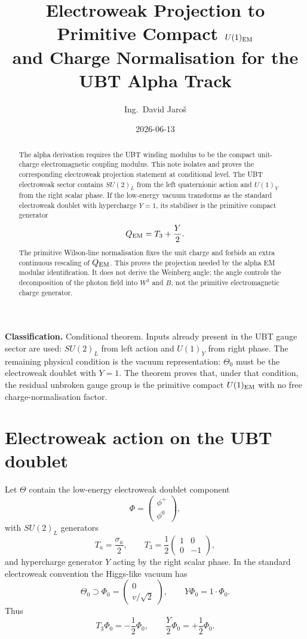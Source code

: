 \documentclass[12pt,a4paper]{article}
\title{Electroweak Projection to Primitive Compact $U(1)_{\rm EM}$\\
       \large and Charge Normalisation for the UBT Alpha Track}
\author{Ing.\ David Jaro\v{s}}
\date{2026-06-13}
\begin{document}
\maketitle
\fi

\begin{abstract}
The alpha derivation requires the UBT winding modulus to be the compact
unit-charge electromagnetic coupling modulus.  This note isolates and proves
the corresponding electroweak projection statement at conditional level.  The
UBT electroweak sector contains \(SU(2)_L\) from the left quaternionic action
and \(U(1)_Y\) from the right scalar phase.  If the low-energy vacuum transforms
as the standard electroweak doublet with hypercharge \(Y=1\), its stabiliser is
the primitive compact generator
\[
  Q_{\rm EM}=T_3+\frac{Y}{2}.
\]
The primitive Wilson-line normalisation fixes the unit charge and forbids an
extra continuous rescaling of \(Q_{\rm EM}\).  This proves the projection needed
by the alpha EM modular identification.  It does not derive the Weinberg angle;
the angle controls the decomposition of the photon field into \(W^3\) and \(B\),
not the primitive electromagnetic charge generator.
\end{abstract}

\begin{statusbox}
\textbf{Classification.} Conditional theorem.  Inputs already present in the
UBT gauge sector are used: \(SU(2)_L\) from left action and \(U(1)_Y\) from
right phase.  The remaining physical condition is the vacuum representation:
\(\Theta_0\) must be the electroweak doublet with \(Y=1\).  The theorem proves
that, under that condition, the residual unbroken gauge group is the primitive
compact \(U(1)_{\rm EM}\) with no free charge-normalisation factor.
\end{statusbox}

\section{Electroweak action on the UBT doublet}

Let \(\Theta\) contain the low-energy electroweak doublet component
\[
  \Phi=\begin{pmatrix}\phi^+\\ \phi^0\end{pmatrix},
\]
with \(SU(2)_L\) generators
\[
  T_a=\frac{\sigma_a}{2},
  \qquad
  T_3=\frac12\begin{pmatrix}1&0\\0&-1\end{pmatrix},
\]
and hypercharge generator \(Y\) acting by the right scalar phase.  In the
standard electroweak convention the Higgs-like vacuum has
\[
  \Theta_0\supset \Phi_0=\begin{pmatrix}0\\v/\sqrt2\end{pmatrix},
  \qquad
  Y\Phi_0=1\cdot\Phi_0 .
\]
Thus
\[
  T_3\Phi_0=-\frac12\Phi_0,
  \qquad
  \frac{Y}{2}\Phi_0=+\frac12\Phi_0.
\]
\end{document}
